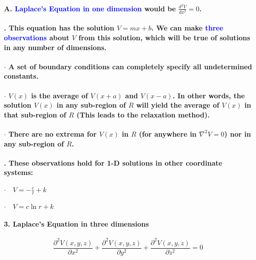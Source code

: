 \documentclass{article}
\begin{document}
\paragraph{\indent A. \textcolor{blue}{Laplace's Equation in one dimension} would be $\frac{d^2V}{dx^2}=0$.}
\paragraph{\indent{}. This equation has the solution $V=mx+b$. We can make \textcolor{blue}{three observations} about $V$ from this solution, which will be true of solutions in any number of dimensions.}
\paragraph{\indent\indent $\cdot$ A set of boundary conditions can completely specify all undetermined constants. }
\paragraph{\indent\indent $\cdot$ $V(x)$ is the average of $V(x+a)$ and $V(x-a)$. In other words, the solution $V(x)$ in any sub-region of $R$ will yield the average of $V(x)$ in that sub-region of $R$ (This leads to the relaxation method).}
\paragraph{\indent\indent $\cdot$ There are no extrema for $V(x)$ in $R$ (for anywhere in $\nabla^2V=0$) nor in any sub-region of $R$.}
\paragraph{\indent{}. These observations hold for 1-D solutions in other coordinate systems:}
\paragraph{\indent\indent $\cdot \quad V = -\frac{c}{r} +k$ }
\paragraph{\indent\indent $\cdot \quad V= c\ln r +k$ }
\paragraph{3. Laplace's Equation in three dimensions}
\begin{equation*}
    \frac{\partial^2 V(x,y,z)}{\partial x^2}+\frac{\partial^2 V(x,y,z)}{\partial y^2}+\frac{\partial^2 V(x,y,z)}{\partial z^2}=0
\end{equation*}
\end{document}
